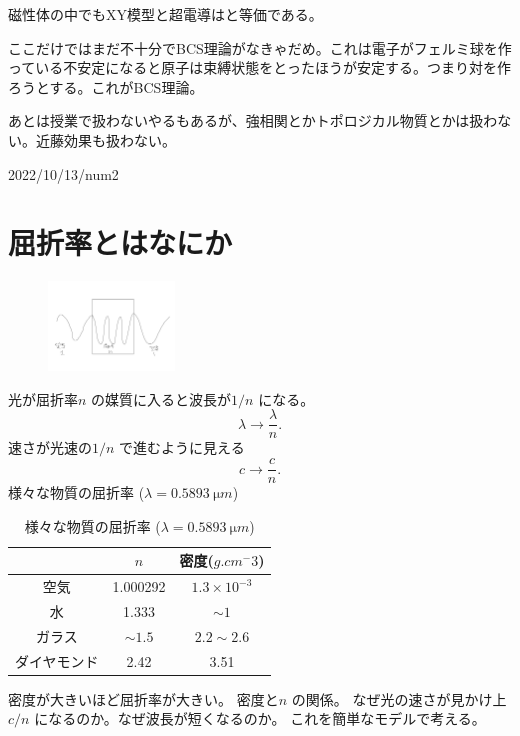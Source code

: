 \documentclass[dvipdfmx,12pt]{jsarticle}
\begin{document}
磁性体の中でもXY模型と超電導はと等価である。

ここだけではまだ不十分でBCS理論がなきゃだめ。これは電子がフェルミ球を作っている不安定になると原子は束縛状態をとったほうが安定する。つまり対を作ろうとする。これがBCS理論。

あとは授業で扱わないやるもあるが、強相関とかトポロジカル物質とかは扱わない。近藤効果も扱わない。


2022/10/13/num2
\section{屈折率とはなにか}

\begin{figure}[H]
	\centering
	\includegraphics[width=0.3\textwidth]{fig2/Fig-2.jpg}
	\label{fig:fig2-Fig-2-jpg}
\end{figure}
光が屈折率$n$ の媒質に入ると波長が$1 /n$ になる。
\[
\lambda\to \frac{\lambda}{n}
.\] 
速さが光速の$1 /n$ で進むように見える
\[
c\to \frac{c}{n}
.\] 
様々な物質の屈折率 ($\lambda=\SI{0.5893}{\micro m}$)
\begin{table}[H]
	\centering
	\caption{様々な物質の屈折率 ($\lambda=\SI{0.5893}{\micro m}$)}
	\label{tab:2-1}
	\begin{tabular}{ccc}\hline
	 &$n$ &密度($\si{g.cm^-3}$)\\ \hline
	空気&1.000292&$1.3\times 10^{-3}$\\
	水&1.333&$\sim 1$\\
	ガラス&$\sim 1.5$&$2.2\sim 2.6$\\
	ダイヤモンド&2.42&3.51\\ \hline
	\end{tabular}
\end{table}
密度が大きいほど屈折率が大きい。
密度と$n$ の関係。
なぜ光の速さが見かけ上$c /n$ になるのか。なぜ波長が短くなるのか。
これを簡単なモデルで考える。
\end{document}
